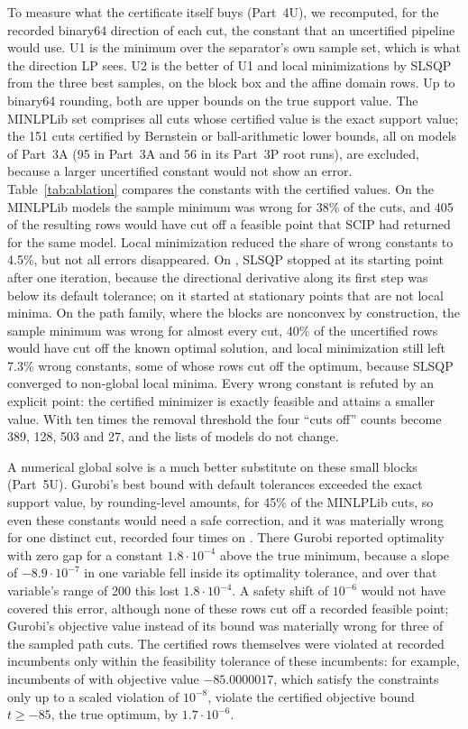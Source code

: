 To measure what the certificate itself buys (Part~4U), we recomputed, for the
recorded binary64 direction of each cut, the constant that an uncertified
pipeline would use. U1 is the minimum over the separator's own sample set,
which is what the direction LP sees. U2 is the better of U1 and local
minimizations by SLSQP \citep{Kraft1988} from the three best samples, on the
block box and the affine domain rows. Up to binary64 rounding, both are upper
bounds on the true support value. The MINLPLib set comprises all cuts whose
certified value is the exact support value; the 151 cuts certified by
Bernstein or ball-arithmetic lower bounds, all on models of Part~3A (95 in
Part~3A and 56 in its Part~3P root runs), are excluded, because a larger
uncertified constant would not show an error. Table~\ref{tab:ablation}
compares the constants with the certified values. On the MINLPLib models the
sample minimum was wrong for 38\% of the cuts, and 405 of the resulting rows
would have cut off a feasible point that SCIP had returned for the same model.
Local minimization reduced the share of wrong constants to 4.5\%, but not all
errors disappeared. On , SLSQP stopped at its starting point after
one iteration, because the directional derivative along its first step was
below its default tolerance; on  it started at
stationary points that are not local minima. On the path family, where the
blocks are nonconvex by construction, the sample minimum was wrong for almost
every cut, 40\% of the uncertified rows would have cut off the known optimal
solution, and local minimization still left 7.3\% wrong constants, some of
whose rows cut off the optimum, because SLSQP converged to non-global local
minima. Every wrong constant is refuted by an explicit point: the certified
minimizer is exactly feasible and attains a smaller value. With ten times the
removal threshold the four ``cuts off'' counts become 389, 128, 503 and 27, and
the lists of models do not change.

A numerical global solve is a much better substitute on these small blocks
(Part~5U). Gurobi's best bound with default tolerances exceeded the exact
support value, by rounding-level amounts, for 45\% of the MINLPLib cuts, so even
these constants would need a safe correction, and it was materially wrong for
one distinct cut, recorded four times on . There Gurobi reported
optimality with zero gap for a constant $1.8\cdot10^{-4}$ above the true
minimum, because a slope of $-8.9\cdot10^{-7}$ in one variable fell inside its
optimality tolerance, and over that variable's range of 200 this lost
$1.8\cdot10^{-4}$. A safety shift of $10^{-6}$ would not
have covered this error, although none of these rows cut off a recorded
feasible point; Gurobi's objective value instead of its bound was materially
wrong for three of the sampled path cuts. The certified rows themselves were
violated at recorded incumbents only within the feasibility tolerance of these
incumbents: for example, incumbents of  with objective value
$-85.0000017$, which satisfy the constraints only up to a scaled violation of
$10^{-8}$, violate the certified objective bound $t\ge-85$, the true optimum, by
$1.7\cdot10^{-6}$.
